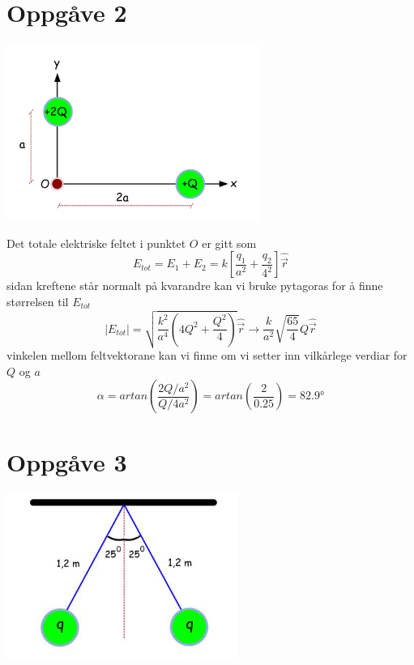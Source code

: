 \documentclass[12pt,a4paper]{article}
\begin{document}
  \section*{Oppgåve 2}
    \begin{center}
      \includegraphics[scale=0.6]{06_2.png}
    \end{center}
    Det totale elektriske feltet i punktet $O$ er gitt som
    \begin{equation}
      E_{tot} = E_1 + E_2 = k\left[ \frac{q_1}{a^2} + \frac{q_2}{4^2} \right] \hat{\vec{r}}
    \end{equation}
    sidan kreftene står normalt på kvarandre kan vi bruke pytagoras for å finne størrelsen
    til $E_{tot}$
    \begin{equation}
      |E_{tot}| = \sqrt{\frac{k^2}{a^4}\left( 4Q^2 + \frac{Q^2}{4} \right) }\hat{\vec{r}}
      \rightarrow \frac{k}{a^2}\sqrt{\frac{65}{4}}Q \hat{\vec{r}}
    \end{equation}
    vinkelen mellom feltvektorane kan vi finne om vi setter inn vilkårlege verdiar for $Q$ og $a$
    \begin{equation}
      \alpha = artan\left( \frac{2Q/a^2}{Q/4a^2} \right)
      = artan\left( \frac{2}{0.25} \right) = \ang{82,9}
    \end{equation}

  \newpage

  \section*{Oppgåve 3}
    \begin{center}
      \includegraphics[scale=0.6]{06_3.png}
    \end{center}
\end{document}
